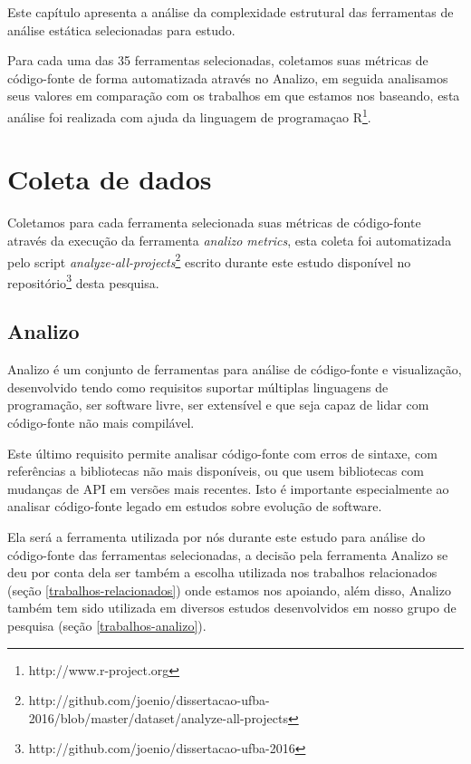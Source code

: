 {Este capítulo apresenta a análise da complexidade estrutural das ferramentas de análise estática selecionadas para estudo.}

Para cada uma das 35 ferramentas selecionadas, coletamos suas métricas de código-fonte de
forma automatizada através no Analizo, em seguida analisamos seus valores em
comparação com os trabalhos em que estamos nos baseando, esta análise foi
realizada com ajuda da linguagem de programaçao
R\footnote{http://www.r-project.org}.


\section{Coleta de dados}

Coletamos para cada ferramenta selecionada suas métricas de código-fonte
através da execução da ferramenta {\it analizo metrics}, esta coleta foi
automatizada pelo script {\it
analyze-all-projects}\footnote{http://github.com/joenio/dissertacao-ufba-2016/blob/master/dataset/analyze-all-projects}
escrito durante este estudo disponível no
repositório\footnote{http://github.com/joenio/dissertacao-ufba-2016} desta
pesquisa.

\subsection{Analizo} \label{analizo}

Analizo é um conjunto de ferramentas para análise de código-fonte e
visualização, desenvolvido tendo como requisitos suportar múltiplas linguagens
de programação, ser software livre, ser extensível e que seja capaz de lidar
com código-fonte não mais compilável.

Este último requisito permite analisar código-fonte com erros de sintaxe, com
referências a bibliotecas não mais disponíveis, ou que usem bibliotecas com
mudanças de API em versões mais recentes. Isto é importante especialmente ao
analisar código-fonte legado em estudos sobre evolução de software.

Ela será a ferramenta utilizada por nós durante este estudo para análise do
código-fonte das ferramentas selecionadas, a decisão pela ferramenta Analizo
se deu por conta dela ser também a escolha utilizada nos trabalhos
relacionados (seção \ref{trabalhos-relacionados}) onde estamos nos apoiando,
além disso, Analizo também tem sido utilizada em diversos estudos
desenvolvidos em nosso grupo de pesquisa (seção \ref{trabalhos-analizo}).


